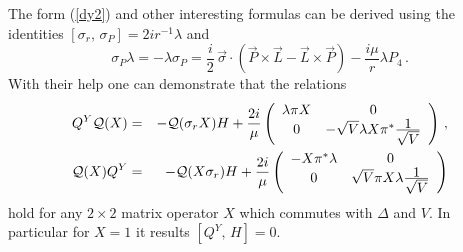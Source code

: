 \documentclass[a4paper,12pt]{article}
\begin{document}
The form (\ref{dy2}) and other interesting formulas can be derived  using the 
identities $[\sigma_r,\, \sigma_P]=2ir^{-1}\lambda$ and
\begin{equation}
\sigma_P\lambda=-\lambda\sigma_P=\frac{i}{2}\,\vec{\sigma}\cdot(\vec{P}\times
\vec{L}-\vec{L}\times\vec{P})-\frac{i\mu}{r}\lambda P_{4}\,.
\end{equation}
With their help one can demonstrate that the relations
\begin{eqnarray}
Q^Y{\cal Q}(X)&=&-{\cal Q}(\sigma_{r}X)H+\frac{2i}{\mu}\left(
\begin{array}{cc}
\lambda\pi X&0\\
0&-\sqrt{V}\lambda X\pi^{*}\frac{\textstyle 1}{\textstyle \sqrt{V}}\\
\end{array}\right)\,,\label{A1}\\
{\cal Q}(X)Q^{Y}&=&-{\cal Q}(X\sigma_{r})H+\frac{2i}{\mu}\left(
\begin{array}{cc}
-X\pi^{*}\lambda&0\\
0&\sqrt{V}\pi X\lambda\frac{\textstyle 1}{\textstyle \sqrt{V}}\\
\end{array}\right) \label{A2}
\end{eqnarray}
hold for any $2\times 2$ matrix operator $X$ which commutes with $\Delta$ and 
$V$. In particular for $X=1$ it results $[Q^{Y},\,H]=0$. 
\end{document}
